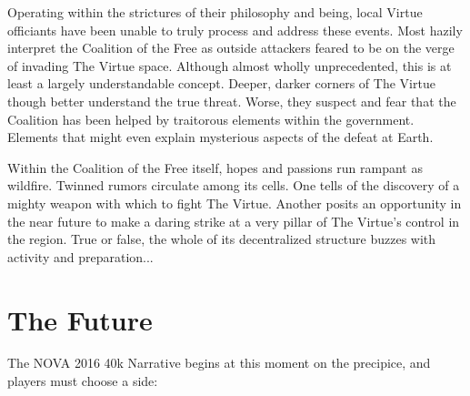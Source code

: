 Operating within the strictures of their philosophy and being, local
Virtue officiants have been unable to truly process and address these
events.  Most hazily interpret the Coalition of the Free as outside
attackers feared to be on the verge of invading The Virtue space.
Although almost wholly unprecedented, this is at least a largely
understandable concept.  Deeper, darker corners of The Virtue though
better understand the true threat.  Worse, they suspect and fear that
the Coalition has been helped by traitorous elements within the
government.  Elements that might even explain mysterious aspects of
the defeat at Earth.

Within the Coalition of the Free itself, hopes and passions run
rampant as wildfire.  Twinned rumors circulate among its cells.  One
tells of the discovery of a mighty weapon with which to fight The
Virtue.  Another posits an opportunity in the near future to make a
daring strike at a very pillar of The Virtue's control in the
region.  True or false, the whole of its decentralized structure
buzzes with activity and preparation...

\section{The Future}

The NOVA 2016 40k Narrative begins at this moment on the precipice,
and players must choose a side:

